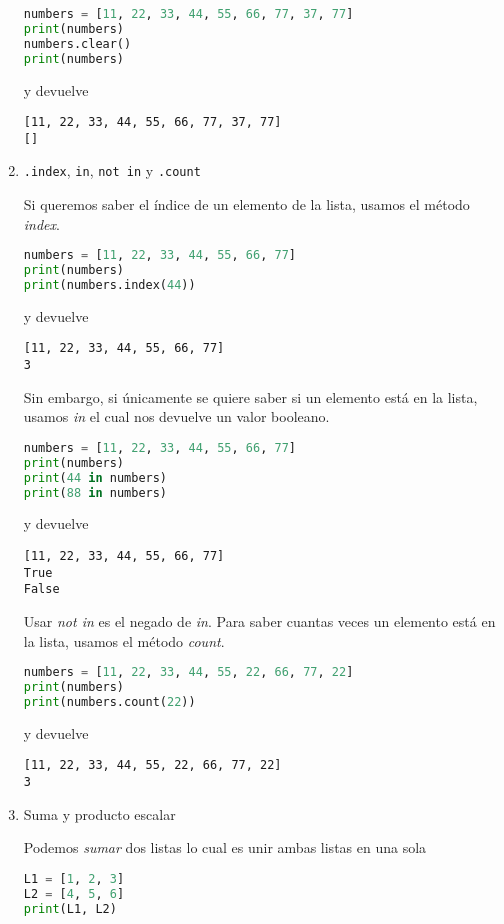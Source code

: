\begin{enumerate}
\begin{lstlisting}[language={python}]
numbers = [11, 22, 33, 44, 55, 66, 77, 37, 77]
print(numbers)
numbers.clear()
print(numbers)
        \end{lstlisting}
        y devuelve
        \begin{lstlisting}[language={[latex]tex}]
[11, 22, 33, 44, 55, 66, 77, 37, 77]
[]
        \end{lstlisting}
        \item \texttt{.index}, \texttt{in}, \texttt{not in} y \texttt{.count}\par 
        Si queremos saber el índice de un elemento de la lista, usamos el método \emph{index}.
        \begin{lstlisting}[language={python}]
numbers = [11, 22, 33, 44, 55, 66, 77]
print(numbers)
print(numbers.index(44))
        \end{lstlisting}
        y devuelve
        \begin{lstlisting}[language={[latex]tex}]
[11, 22, 33, 44, 55, 66, 77]
3
        \end{lstlisting}
        Sin embargo, si únicamente se quiere saber si un elemento está en la lista, usamos \emph{in} el cual nos devuelve un valor booleano.
        \begin{lstlisting}[language={python}]
numbers = [11, 22, 33, 44, 55, 66, 77]
print(numbers)
print(44 in numbers) 
print(88 in numbers)
        \end{lstlisting}
        y devuelve
        \begin{lstlisting}[language={[latex]tex}]
[11, 22, 33, 44, 55, 66, 77]
True
False
        \end{lstlisting}
        Usar \emph{not in} es el negado de \emph{in}.
        Para saber cuantas veces un elemento está en la lista, usamos el método \emph{count}.
        \begin{lstlisting}[language={python}]
numbers = [11, 22, 33, 44, 55, 22, 66, 77, 22]
print(numbers)
print(numbers.count(22)) 
        \end{lstlisting}
        y devuelve
        \begin{lstlisting}[language={[latex]tex}]
[11, 22, 33, 44, 55, 22, 66, 77, 22]
3
        \end{lstlisting}
        \item Suma y producto escalar\par 
        Podemos \emph{sumar} dos listas lo cual es unir ambas listas en una sola
        \begin{lstlisting}[language={python}]
L1 = [1, 2, 3]
L2 = [4, 5, 6]
print(L1, L2)

\end{lstlisting}
\end{enumerate}
